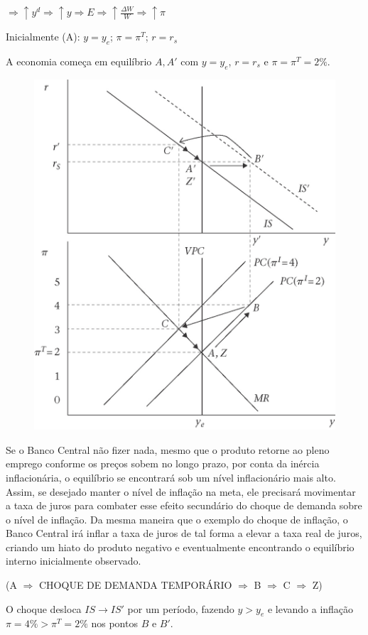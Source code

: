 \documentclass[a4paper,12pt]{article}[abntex2]
\begin{document}
\(\Rightarrow \uparrow y^d \Rightarrow \uparrow y \Rightarrow E \Rightarrow \uparrow \frac{\Delta W}{W} \Rightarrow \uparrow \pi \)

Inicialmente (A): \( y = y_e \); \( \pi = \pi^T \); \( r = r_s \)

A economia começa em equilíbrio \( A, A' \) com \( y = y_e \), \( r = r_s \) e \( \pi = \pi^T = 2\% \).

\begin{figure}[H]
    \centering
    \includegraphics[width=0.7\linewidth]{Imagens/a13i2.png}
\end{figure}

Se o Banco Central não fizer nada, mesmo que o produto retorne ao pleno emprego conforme os preços sobem no longo prazo, por conta da inércia inflacionária, o equilíbrio se encontrará sob um nível inflacionário mais alto. Assim, se desejado manter o nível de inflação na meta, ele precisará movimentar a taxa de juros para combater esse efeito secundário do choque de demanda sobre o nível de inflação. Da mesma maneira que o exemplo do choque de inflação, o Banco Central irá inflar a taxa de juros de tal forma a elevar a taxa real de juros, criando um hiato do produto negativo e eventualmente encontrando o equilíbrio interno inicialmente observado.

\noindent (A \( \Rightarrow \) CHOQUE DE DEMANDA TEMPORÁRIO \( \Rightarrow \) B \( \Rightarrow \) C \( \Rightarrow \) Z)

O choque desloca \( IS \to IS' \) por um período, fazendo \( y > y_e \) e levando a inflação \( \pi = 4\% > \pi^T = 2\% \) nos pontos \( B \) e \( B' \).
\end{document}
